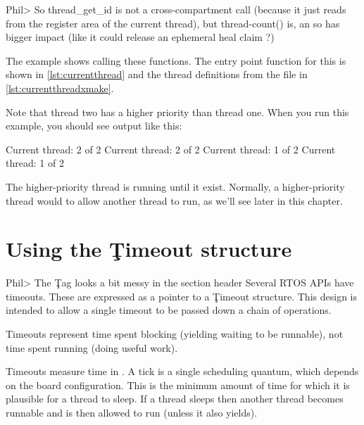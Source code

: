 
Phil> So thread_get_id is not a cross-compartment call (because it just reads from the register area of the current thread), but thread-count() is, an so has bigger impact (like it could release an ephemeral heal claim ?)

The  example shows calling these functions.
The entry point function for this is shown in \ref{lst:currentthread} and the thread definitions from the  file in \ref{lst:currentthreadxmake}.

\codelisting[filename=examples/current_thread/current.cc,marker=entry,label=lst:currentthread,caption="A simple example that prints the current thread"]{}

\lualisting[filename=examples/current_thread/xmake.lua,marker=threads,label=lst:currentthreadxmake,caption="The thread definitions for the current-thread example"]{}

Note that thread two has a higher priority than thread one.
When you run this example, you should see output like this:

\begin{console}
Current thread: 2 of 2
Current thread: 2 of 2
Current thread: 1 of 2
Current thread: 1 of 2
\end{console}

The higher-priority thread is running until it exist.
Normally, a higher-priority thread would  to allow another thread to run, as we'll see later in this chapter.

\section[label=timeouts]{Using the \c{Timeout} structure}
Phil> The \c Tag looks a bit messy in the section header
Several RTOS APIs have timeouts.
These are expressed as a pointer to a \c{Timeout} structure.
This design is intended to allow a single timeout to be passed down a chain of operations.

\begin{note}
Timeouts represent time spent blocking (yielding waiting to be runnable), not time spent running (doing useful work).
\end{note}

Timeouts measure time in .
A tick is a single scheduling quantum, which depends on the board configuration.
This is the minimum amount of time for which it is plausible for a thread to sleep.
If a thread sleeps then another thread becomes runnable and is then allowed to run (unless it also yields).

